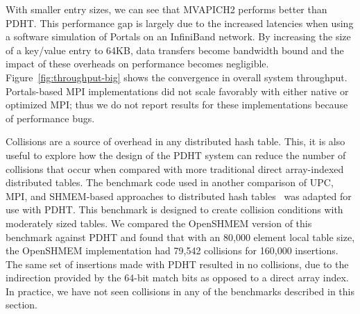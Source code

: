 With smaller
entry sizes, we can see that MVAPICH2 performs better than PDHT. 
This performance gap is largely due to the increased latencies when using a
software simulation of Portals on an InfiniBand network. By increasing the size of a key/value entry to
64KB, data transfers become bandwidth bound and the impact of these overheads on performance becomes negligible.
Figure~\ref{fig:throughput-big} shows the convergence in overall system
throughput. Portals-based MPI implementations did not scale favorably with
either native or optimized MPI; thus we do not report results for these implementations because of performance bugs.



Collisions are a source of overhead in any distributed hash table.  This, it
is also useful to explore how the design of the PDHT system can reduce the
number of collisions that occur when compared with  more traditional direct
array-indexed distributed tables. The benchmark code used in another comparison
of UPC, MPI, and SHMEM-based approaches to distributed hash
tables~\cite{maynard:12} was adapted for use with PDHT. This benchmark is
designed to create collision conditions with moderately sized tables. We
compared the OpenSHMEM version of this benchmark against PDHT and found that
with an 80,000 element local table size, the OpenSHMEM implementation had
79,542 collisions for 160,000 insertions. The same set of insertions made with
PDHT resulted in no collisions, due to the indirection provided by the
64-bit match bits as opposed to a direct array index. In practice, we have
not seen collisions in any of the benchmarks described in this section.




